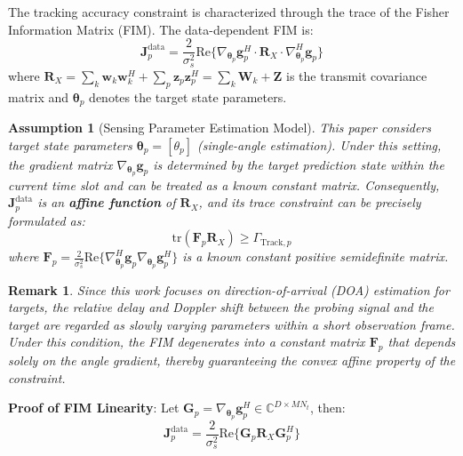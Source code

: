 \documentclass[12pt,a4paper]{article}
\newtheorem{assumption}{Assumption}
\newtheorem{remark}{Remark}
\newcommand{\vect}[1]{\mathbf{#1}}
\newcommand{\mat}[1]{\mathbf{#1}}
\newcommand{\tr}{\text{tr}}
\newcommand{\Real}{\text{Re}}
\begin{document}
The tracking accuracy constraint is characterized through the trace of the Fisher Information Matrix (FIM). The data-dependent FIM is:
\begin{equation}
\mat{J}_p^{\text{data}} = \frac{2}{\sigma_s^2} \Real\Big\{ \nabla_{\boldsymbol{\theta}_p} \vect{g}_p^H \cdot \mat{R}_X \cdot \nabla_{\boldsymbol{\theta}_p}^H \vect{g}_p \Big\} \tag{11}
\end{equation}
where $\mat{R}_X = \sum_k \vect{w}_k \vect{w}_k^H + \sum_p \vect{z}_p \vect{z}_p^H = \sum_k \mat{W}_k + \mat{Z}$ is the transmit covariance matrix and $\boldsymbol{\theta}_p$ denotes the target state parameters.

\begin{assumption}[Sensing Parameter Estimation Model]\label{ass:1}
This paper considers target state parameters $\boldsymbol{\theta}_p = [\theta_p]$ (single-angle estimation). Under this setting, the gradient matrix $\nabla_{\boldsymbol{\theta}_p} \vect{g}_p$ is determined by the target prediction state within the current time slot and can be treated as a known constant matrix. Consequently, $\mat{J}_p^{\text{data}}$ is an \textbf{affine function} of $\mat{R}_X$, and its trace constraint can be precisely formulated as:
\begin{equation}
\tr(\mat{F}_p \mat{R}_X) \geq \Gamma_{\text{Track},p}
\end{equation}
where $\mat{F}_p = \frac{2}{\sigma_s^2} \Real\Big\{ \nabla_{\boldsymbol{\theta}_p}^H \vect{g}_p \nabla_{\boldsymbol{\theta}_p} \vect{g}_p^H \Big\}$ is a known constant positive semidefinite matrix.
\end{assumption}

\begin{remark}
Since this work focuses on direction-of-arrival (DOA) estimation for targets, the relative delay and Doppler shift between the probing signal and the target are regarded as slowly varying parameters within a short observation frame. Under this condition, the FIM degenerates into a constant matrix $\mat{F}_p$ that depends solely on the angle gradient, thereby guaranteeing the convex affine property of the constraint.
\end{remark}

\textbf{Proof of FIM Linearity}: Let $\mat{G}_p = \nabla_{\boldsymbol{\theta}_p} \vect{g}_p^H \in \mathbb{C}^{D \times MN_t}$, then:
\begin{equation}
\mat{J}_p^{\text{data}} = \frac{2}{\sigma_s^2} \Real\{ \mat{G}_p \mat{R}_X \mat{G}_p^H \}
\end{equation}
\end{document}
